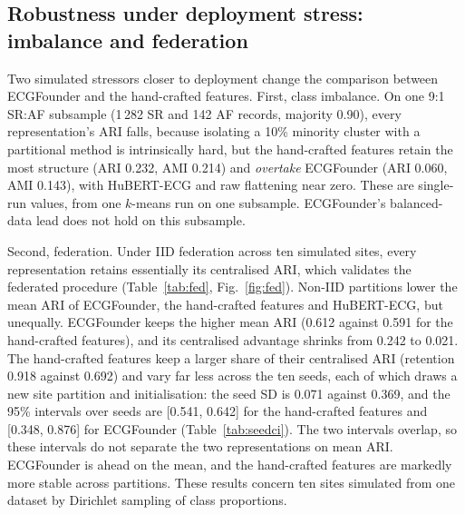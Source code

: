 \documentclass[preprint,11pt]{elsarticle}
\begin{document}
\subsection{Robustness under deployment stress: imbalance and federation}

Two simulated stressors closer to deployment change the comparison between ECGFounder
and the hand-crafted features. First, class imbalance. On one 9:1 SR:AF subsample
(1\,282 SR and 142 AF records, majority 0.90), every representation's ARI falls, because
isolating a 10\% minority cluster with a partitional method is intrinsically hard, but the
hand-crafted features retain the most structure (ARI 0.232, AMI 0.214) and
\emph{overtake} ECGFounder (ARI 0.060, AMI 0.143), with HuBERT-ECG and raw flattening near
zero. These are single-run values, from one $k$-means run on one subsample. ECGFounder's balanced-data lead does not hold on this subsample.

Second, federation. Under IID federation across ten simulated sites, every representation
retains essentially its centralised ARI, which validates the federated procedure
(Table~\ref{tab:fed}, Fig.~\ref{fig:fed}). Non-IID partitions lower the mean ARI of
ECGFounder, the hand-crafted features and HuBERT-ECG, but unequally. ECGFounder keeps the
higher mean ARI (0.612 against 0.591 for the hand-crafted features), and its centralised
advantage shrinks from 0.242 to 0.021. The hand-crafted features keep a larger share of
their centralised ARI (retention 0.918 against 0.692) and vary far less across the ten
seeds, each of which draws a new site partition and initialisation: the seed SD is 0.071
against 0.369, and the 95\% intervals over seeds are [0.541, 0.642] for the hand-crafted
features and [0.348, 0.876] for ECGFounder (Table~\ref{tab:seedci}). The two intervals
overlap, so these intervals do not separate the two representations on mean ARI.
ECGFounder is ahead on the mean, and the hand-crafted features are markedly more stable
across partitions. These results concern ten sites simulated from one dataset by Dirichlet
sampling of class proportions.
\end{document}
